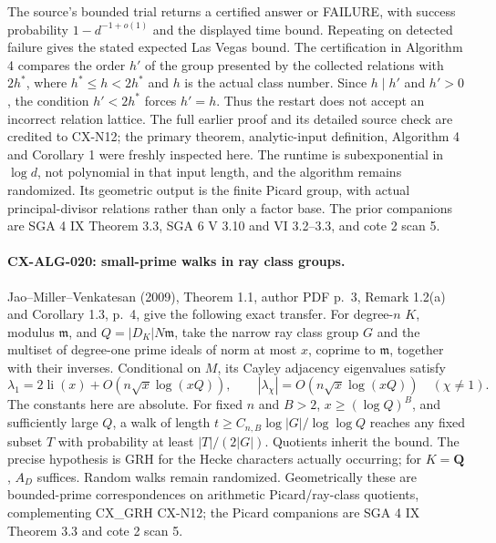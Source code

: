 The source's bounded trial returns a certified answer or FAILURE, with
success probability $1-d^{-1+o(1)}$ and the displayed time bound. Repeating
on detected failure gives the stated expected Las Vegas bound. The
certification in Algorithm 4 compares the order $h'$ of the group presented
by the collected relations with $2h^*$, where $h^*\le h<2h^*$ and $h$
is the actual class number. Since $h\mid h'$ and $h'>0$, the condition
$h'<2h^*$ forces $h'=h$. Thus the restart does not accept an incorrect
relation lattice. The full earlier proof and its detailed source check are
credited to CX-N12; the primary theorem, analytic-input definition,
Algorithm 4 and Corollary 1 were freshly inspected here.
The runtime is subexponential in $\log d$, not polynomial in that input
length, and the algorithm remains randomized. Its geometric output is the
finite Picard group, with actual principal-divisor relations rather than
only a factor base. The prior companions are SGA 4 IX Theorem 3.3,
SGA 6 V 3.10 and VI 3.2--3.3, and cote 2 scan 5.

\paragraph{CX-ALG-020: small-prime walks in ray class groups.}
Jao--Miller--Venkatesan (2009), Theorem 1.1, author PDF p.~3,
Remark 1.2(a) and Corollary 1.3, p.~4, give the following exact transfer.
For degree-$n$ $K$, modulus $\mathfrak m$, and
$Q=|D_K|N\mathfrak m$, take the narrow ray class group $G$ and the
multiset of degree-one prime ideals of norm at most $x$, coprime to
$\mathfrak m$, together with their inverses. Conditional on $M$, its
Cayley adjacency eigenvalues satisfy
\[
 \lambda_1=2\operatorname{li}(x)+O(n\sqrt x\log(xQ)),\qquad
 |\lambda_\chi|=O(n\sqrt x\log(xQ))\quad(\chi\ne1).
\]
The constants here are absolute. For fixed $n$ and $B>2$,
$x\ge(\log Q)^B$, and sufficiently large $Q$, a walk of length
$t\ge C_{n,B}\log|G|/\log\log Q$ reaches any fixed subset $T$ with
probability at least $|T|/(2|G|)$. Quotients inherit the bound.
The precise hypothesis is GRH for the Hecke characters actually occurring;
for $K=\mathbf Q$, $A_D$ suffices. Random walks remain randomized.
Geometrically these are bounded-prime correspondences on arithmetic
Picard/ray-class quotients, complementing CX\_GRH CX-N12; the Picard
companions are SGA 4 IX Theorem 3.3 and cote 2 scan 5.

